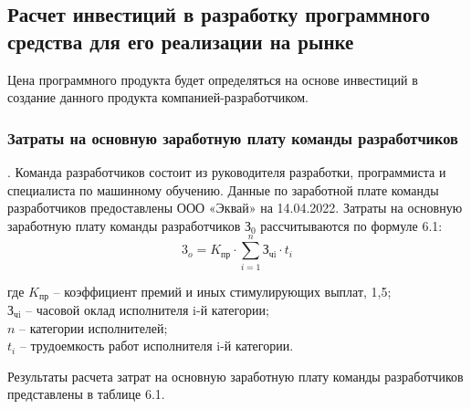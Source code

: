 \subsection{Расчет инвестиций в разработку программного средства для его реализации на рынке}

Цена программного продукта будет определяться на основе инвестиций в создание данного продукта компанией-разработчиком.

\subsubsection{Затраты на основную заработную плату команды разработчиков}. Команда разработчиков состоит из руководителя разработки, программиста и специалиста по машинному обучению.
Данные по заработной плате команды разработчиков предоставлены ООО «Эквай» на 14.04.2022.
Затраты на основную заработную плату команды разработчиков $\text{З}_0$ рассчитываются по формуле 6.1:
\begin{equation}
	\text{3}_o = K_{\text{пр}} \cdot \sum_{i=1}^{n}{\text{З}_{\text{чi}} \cdot t_i}
\end{equation}
\begin{explanation}
	где $K_{\text{пр}}$ – коэффициент премий и иных стимулирующих выплат, 1,5; \\
	$\text{З}_{\text{чi}}$ – часовой оклад исполнителя i-й категории; \\
	$n$ – категории исполнителей; \\
	$t_i$ – трудоемкость работ исполнителя i-й категории.
\end{explanation}

Результаты расчета затрат на основную заработную плату команды разработчиков представлены в таблице 6.1.

